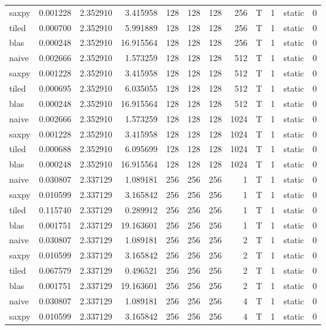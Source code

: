 \documentclass[
  12pt,
  xcolor = usenames,dvipsnames]{article}
\begin{document}
\begin{table}[!h]
{\begin{tabular}[t]{lrrrrrrrlrlr}
saxpy & 0.001228 & 2.352910 & 3.415958 & 128 & 128 & 128 & 256 & T & 1 & static & 0\\
tiled & 0.000700 & 2.352910 & 5.991889 & 128 & 128 & 128 & 256 & T & 1 & static & 0\\
blas & 0.000248 & 2.352910 & 16.915564 & 128 & 128 & 128 & 256 & T & 1 & static & 0\\
\addlinespace
naive & 0.002666 & 2.352910 & 1.573259 & 128 & 128 & 128 & 512 & T & 1 & static & 0\\
saxpy & 0.001228 & 2.352910 & 3.415958 & 128 & 128 & 128 & 512 & T & 1 & static & 0\\
tiled & 0.000695 & 2.352910 & 6.035055 & 128 & 128 & 128 & 512 & T & 1 & static & 0\\
blas & 0.000248 & 2.352910 & 16.915564 & 128 & 128 & 128 & 512 & T & 1 & static & 0\\
naive & 0.002666 & 2.352910 & 1.573259 & 128 & 128 & 128 & 1024 & T & 1 & static & 0\\
\addlinespace
saxpy & 0.001228 & 2.352910 & 3.415958 & 128 & 128 & 128 & 1024 & T & 1 & static & 0\\
tiled & 0.000688 & 2.352910 & 6.095699 & 128 & 128 & 128 & 1024 & T & 1 & static & 0\\
blas & 0.000248 & 2.352910 & 16.915564 & 128 & 128 & 128 & 1024 & T & 1 & static & 0\\
naive & 0.030807 & 2.337129 & 1.089181 & 256 & 256 & 256 & 1 & T & 1 & static & 0\\
saxpy & 0.010599 & 2.337129 & 3.165842 & 256 & 256 & 256 & 1 & T & 1 & static & 0\\
\addlinespace
tiled & 0.115740 & 2.337129 & 0.289912 & 256 & 256 & 256 & 1 & T & 1 & static & 0\\
blas & 0.001751 & 2.337129 & 19.163601 & 256 & 256 & 256 & 1 & T & 1 & static & 0\\
naive & 0.030807 & 2.337129 & 1.089181 & 256 & 256 & 256 & 2 & T & 1 & static & 0\\
saxpy & 0.010599 & 2.337129 & 3.165842 & 256 & 256 & 256 & 2 & T & 1 & static & 0\\
tiled & 0.067579 & 2.337129 & 0.496521 & 256 & 256 & 256 & 2 & T & 1 & static & 0\\
\addlinespace
blas & 0.001751 & 2.337129 & 19.163601 & 256 & 256 & 256 & 2 & T & 1 & static & 0\\
naive & 0.030807 & 2.337129 & 1.089181 & 256 & 256 & 256 & 4 & T & 1 & static & 0\\
saxpy & 0.010599 & 2.337129 & 3.165842 & 256 & 256 & 256 & 4 & T & 1 & static & 0\\

\end{tabular}}
\end{table}
\end{document}
